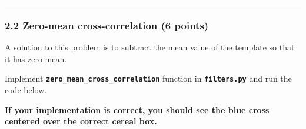 \documentclass[11pt]{article}
\begin{document}
    \begin{center}\rule{0.5\linewidth}{0.5pt}\end{center}

\hypertarget{zero-mean-cross-correlation-6-points}{%
\subsubsection{2.2 Zero-mean cross-correlation (6
points)}\label{zero-mean-cross-correlation-6-points}}

A solution to this problem is to subtract the mean value of the template
so that it has zero mean.

Implement \textbf{\texttt{zero\_mean\_cross\_correlation}} function in
\textbf{\texttt{filters.py}} and run the code below.

\textbf{If your implementation is correct, you should see the blue cross
centered over the correct cereal box.}
\end{document}

